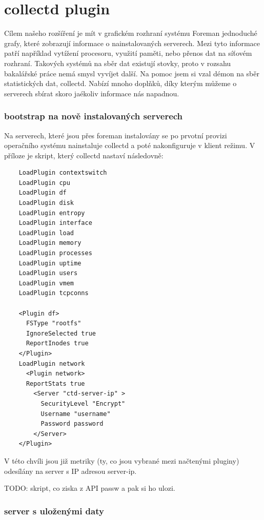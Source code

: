\documentclass[thesis=B,czech]{FITthesis}[2012/06/26]
\begin{document}
\begin{verbatim}
\end{verbatim}







\section{collectd plugin}

Cílem našeho rozšíření je mít v grafickém rozhraní systému Foreman jednoduché grafy, které zobrazují informace o nainstalovaných serverech. Mezi tyto informace patří například vytížení procesoru, využití paměti, nebo přenos dat na síťovém rozhraní. Takových systémů na sběr dat existují stovky, proto v rozsahu bakalářské práce nemá smysl vyvíjet další. Na pomoc jsem si vzal démon na sběr statistických dat, collectd. Nabízí mnoho doplňků, díky kterým můžeme o serverech sbírat skoro jaékoliv informace nás napadnou.

\subsubsection{bootstrap na nově instalovaných serverech}

Na serverech, které jsou přes foreman instalovány se po prvotní provizi operačního systému nainstaluje collectd a poté nakonfiguruje v klient režimu. V příloze je skript, který collectd nastaví následovně:

\begin{verbatim}
	LoadPlugin contextswitch
	LoadPlugin cpu
	LoadPlugin df
	LoadPlugin disk
	LoadPlugin entropy
	LoadPlugin interface
	LoadPlugin load
	LoadPlugin memory
	LoadPlugin processes
	LoadPlugin uptime
	LoadPlugin users
	LoadPlugin vmem
	LoadPlugin tcpconns

	<Plugin df>
	  FSType "rootfs"
	  IgnoreSelected true
	  ReportInodes true
	</Plugin>
	LoadPlugin network
	  <Plugin network>
	  ReportStats true
	    <Server "ctd-server-ip" >
	      SecurityLevel "Encrypt"
	      Username "username"
	      Password password
	    </Server>
	</Plugin>
\end{verbatim}

V této chvíli jsou již metriky (ty, co jsou vybrané mezi načtenými pluginy) odesílány na server s IP adresou server-ip.

TODO: skript, co ziska z API passw a pak si ho ulozi.


\subsubsection{server s uloženými daty}
\end{document}
